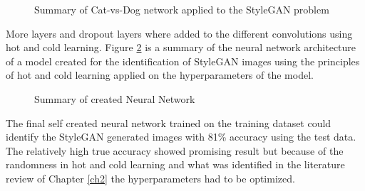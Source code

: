 \begin{figure}[H]%
\centering
{}%
\caption{Summary of Cat-vs-Dog network applied to the StyleGAN problem}%
\label{fig:nn1}%
\end{figure}

More layers and dropout layers where added to the different convolutions using hot and cold learning. Figure \ref{fig:nn2} is a summary of the neural network architecture of a model created for the identification of StyleGAN images using the principles of hot and cold learning applied on the hyperparameters of the model.  

\begin{figure}[H]%
\centering
{}%
\caption{Summary of created Neural Network}%
\label{fig:nn2}%
\end{figure}

The final self created neural network trained on the training dataset could identify the StyleGAN generated images with 81\% accuracy using the test data. The relatively high true accuracy showed promising result but because of the randomness in hot and cold learning and what was identified in the literature review of Chapter \ref{ch2} the hyperparameters had to be optimized.


